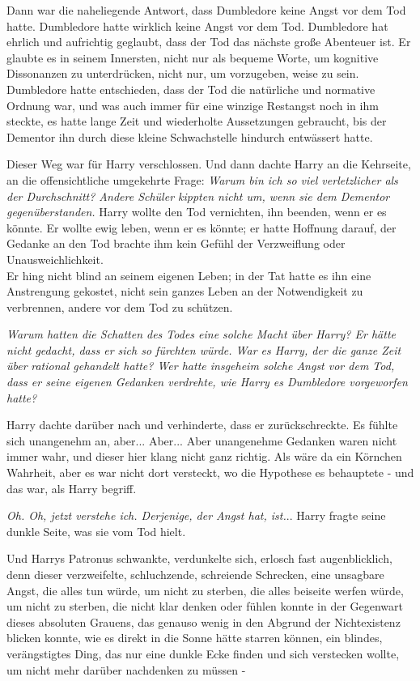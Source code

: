 {Dann war die naheliegende Antwort, dass Dumbledore keine Angst vor dem Tod hatte. Dumbledore hatte wirklich keine Angst vor dem Tod. Dumbledore hat ehrlich und aufrichtig geglaubt, dass der Tod das nächste große Abenteuer ist. Er glaubte es in seinem Innersten, nicht nur als bequeme Worte, um kognitive Dissonanzen zu unterdrücken, nicht nur, um vorzugeben, weise zu sein. Dumbledore hatte entschieden, dass der Tod die natürliche und normative Ordnung war, und was auch immer für eine winzige Restangst noch in ihm steckte, es hatte lange Zeit und wiederholte Aussetzungen gebraucht, bis der Dementor ihn durch diese kleine Schwachstelle hindurch entwässert hatte.

Dieser Weg war für Harry verschlossen. Und dann dachte Harry an die Kehrseite, an die offensichtliche umgekehrte Frage: \emph{Warum bin ich so viel verletzlicher als der Durchschnitt? Andere Schüler kippten nicht um, wenn sie dem Dementor gegenüberstanden.} Harry wollte den Tod vernichten, ihn beenden, wenn er es könnte. Er wollte ewig leben, wenn er es könnte; er hatte Hoffnung darauf, der Gedanke an den Tod brachte ihm kein Gefühl der Verzweiflung oder Unausweichlichkeit.\\ Er hing nicht blind an seinem eigenen Leben; in der Tat hatte es ihn eine Anstrengung gekostet, nicht sein ganzes Leben an der Notwendigkeit zu verbrennen, andere vor dem Tod zu schützen.

\emph{Warum hatten die Schatten des Todes eine solche Macht über Harry? Er hätte nicht gedacht, dass er sich so fürchten würde. War es Harry, der die ganze Zeit über} \emph{rational gehandelt hatte? Wer hatte insgeheim solche Angst vor dem Tod, dass er seine eigenen Gedanken verdrehte, wie Harry es Dumbledore vorgeworfen hatte?}

Harry dachte darüber nach und verhinderte, dass er zurückschreckte. Es fühlte sich unangenehm an, aber... Aber... Aber unangenehme Gedanken waren nicht immer wahr, und dieser hier klang nicht ganz richtig. Als wäre da ein Körnchen Wahrheit, aber es war nicht dort versteckt, wo die Hypothese es behauptete - und das war, als Harry begriff.

\emph{Oh. Oh, jetzt verstehe ich. Derjenige, der Angst hat, ist.}.. Harry fragte seine dunkle Seite, was sie vom Tod hielt.

Und Harrys Patronus schwankte, verdunkelte sich, erlosch fast augenblicklich, denn dieser verzweifelte, schluchzende, schreiende Schrecken, eine unsagbare Angst, die alles tun würde, um nicht zu sterben, die alles beiseite werfen würde, um nicht zu sterben, die nicht klar denken oder fühlen konnte in der Gegenwart dieses absoluten Grauens, das genauso wenig in den Abgrund der Nichtexistenz blicken konnte, wie es direkt in die Sonne hätte starren können, ein blindes, verängstigtes Ding, das nur eine dunkle Ecke finden und sich verstecken wollte, um nicht mehr darüber nachdenken zu müssen -

}
